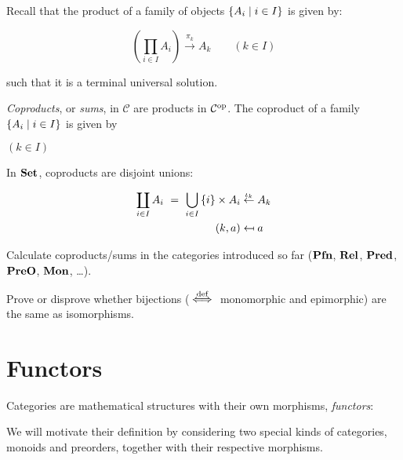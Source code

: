 Recall that the product of a family of objects $\{ A_i \mid i \in I \}$
is given by:

\begin{equation*}
    \left(\prod_{i\in I} A_i\right) \xrightarrow{\pi_k} A_k
    \qquad (k\in I)
\end{equation*}

such that it is a terminal universal solution.

\begin{definition}
\emph{Coproducts}, or \emph{sums}, in $\mathcal{C}$ are products in
$\mathcal{C}^{\mathrm{op}}$. The coproduct of a family
$\{ A_i \mid i \in I \}$ is given by

\begin{center}
    \qquad$(k\in I)$
\end{center}
\end{definition}

In $\mathbf {Set}$, coproducts are disjoint unions:

\begin{equation*}
    \begin{aligned}
        \coprod_{i \in I} A_i \ = \ \bigcup_{i \in I}\, \setof{i} \times A_i &
        \overset{\iota_k}{\leftarrow} A_k
        \\
        (k, a) &
        \mapsfrom a
    \end{aligned}
\end{equation*}

\begin{exercise}
Calculate coproducts/sums in the categories introduced so far ($\mathbf {Pfn}$,
$\mathbf {Rel}$, $\mathbf {Pred}$, $\mathbf {PreO}$, $\mathbf {Mon}$, \dots).
\end{exercise}

\begin{exercise}
Prove or disprove whether bijections ($\stackrel{\text{def}}{\iff}$ monomorphic and epimorphic) are
the same as isomorphisms.
\end{exercise}

\section{Functors}

Categories are mathematical structures with their own morphisms,
\emph{functors}:
\begin{center}
\end{center}
We will motivate their definition by considering two special kinds of
categories, monoids and preorders, together with their respective morphisms.

